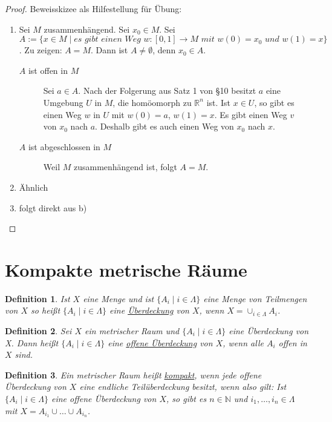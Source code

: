 \documentclass[10pt,a4paper]{report}
\newtheorem*{defi}{Definition}
\begin{document}
\begin{proof}
  Beweisskizee als Hilfestellung für Übung:
  \begin{enumerate}[label={\alph*)}]
  \item Sei $M$ zusammenhängend.
    Sei $x_{0} \in M$.
    Sei $A := \{ x \in M \mid \textit{es gibt einen Weg $w : [0, 1] \rightarrow M$ mit $w(0) = x_0$ und $w(1) = x$} \}$.
    Zu zeigen: $A = M$.
    Dann ist $A \ne \emptyset$, denn $x_{0} \in A$.
    \begin{description}
    \item[$A$ ist offen in $M$] Sei $a \in A$.
      Nach der Folgerung aus Satz 1 von §10 besitzt $a$ eine Umgebung $U$ in $M$, die homöomorph zu $\mathbb{R}^{n}$ ist.
      Ist $x \in U$, so gibt es einen Weg $w$ in $U$ mit $w(0) = a$, $w(1) = x$.
      Es gibt einen Weg $v$ von $x_{0}$ nach $a$.
      Deshalb gibt es auch einen Weg von $x_{0}$ nach $x$.
      \item[$A$ ist abgeschlossen in $M$] Weil $M$ zusammenhängend ist, folgt $A = M$.
    \end{description}
  \item Ähnlich
  \item folgt direkt aus b)
  \end{enumerate}
\end{proof}

\section{Kompakte metrische Räume}

\begin{defi}
  Ist $X$ eine Menge und ist $\{ A_{i} \mid i \in \Lambda \}$ eine Menge von Teilmengen von $X$ so heißt $\{ A_{i} \mid i \in \Lambda \}$ eine \underline{Überdeckung} von $X$, wenn $X = \cup_{i \in \Lambda} A_{i}$.
\end{defi}

\begin{defi}
  Sei $X$ ein metrischer Raum und $\{ A_{i} \mid i \in \Lambda \}$ eine Überdeckung von X.
  Dann heißt $\{ A_{i} \mid i \in \Lambda \}$ eine \underline{offene Überdeckung} von $X$, wenn alle $A_{i}$ offen in $X$ sind.
\end{defi}

\begin{defi}
  Ein metrischer Raum heißt \underline{kompakt}, wenn jede offene Überdeckung von $X$ eine endliche Teilüberdeckung besitzt, wenn also gilt:
  Ist $\{ A_{i} \mid i \in \Lambda \}$ eine offene Überdeckung von $X$, so gibt es $n \in \mathbb{N}$ und $i_{1}, \dots, i_{n} \in \Lambda$ mit $X = A_{i_{1}} \cup \dots \cup A_{i_{n}}$.
\end{defi}
\end{document}
